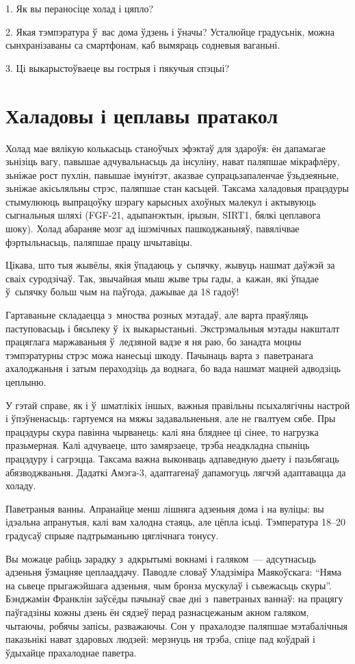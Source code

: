 1. Як вы пераносіце холад і цяпло?

2. Якая тэмпэратура ў~вас дома ўдзень і ўначы? Усталюйце градусьнік, можна сынхранізаваны са смартфонам, каб вымяраць содневыя ваганьні.

3. Ці выкарыстоўваеце вы гострыя і пякучыя спэцыі?


\section{Халадовы і цеплавы пратакол}

Холад мае вялікую колькасьць станоўчых эфэктаў для здароўя: ён дапамагае зьнізіць вагу, павышае адчувальнасьць да інсуліну, нават паляпшае мікрафлёру, зьніжае рост пухлін, павышае імунітэт, аказвае супрацьзапаленчае ўзьдзеяньне, зьніжае акісьляльны стрэс, паляпшае стан касьцей. Таксама халадовыя працэдуры стымулююць выпрацоўку шэрагу карысных ахоўных малекул і актывуюць сыгнальныя шляхі (FGF-21, адыпанэктын, ірызын, SIRT1, бялкі цеплавога шоку). Холад абараняе мозг ад ішэмічных пашкоджаньняў, павялічвае фэртыльнасьць, паляпшае працу шчытавіцы.

Цікава, што тыя жывёлы, якія ўпадаюць у~сьпячку, жывуць нашмат даўжэй за сваіх суродзічаў. Так, звычайная мыш жыве тры гады, а~кажан, які ўпадае ў~сьпячку больш чым на паўгода, дажывае да 18 гадоў!

Гартаваньне складаецца з~мноства розных мэтадаў, але варта праяўляць паступовасьць і бясьпеку ў~іх выкарыстаньні. Экстрэмальныя мэтады накшталт працяглага маржаваньня ў~ледзяной вадзе я ня раю, бо занадта моцны тэмпэратурны стрэс можа нанесьці шкоду. Пачынаць варта з~паветранага ахалоджаньня і затым пераходзіць да воднага, бо вада нашмат мацней адводзіць цеплыню.

У гэтай справе, як і ў~шматлікіх іншых, важныя правільны псыхалягічны настрой і ўпэўненасьць: гартуемся на мяжы задавальненьня, але не гвалтуем сябе. Пры працэдуры скура павінна чырванець: калі яна бляднее ці сінее, то нагрузка празьмерная. Калі адчуваеце, што замярзаеце, трэба неадкладна спыніць працэдуру і сагрэцца. Таксама важна выконваць адпаведную дыету і пазьбягаць абязводжваньня. Дадаткі Амэга-3, адаптагенаў дапамогуць лягчэй адаптавацца да холаду.

Паветраныя ванны. Апранайце менш лішняга адзеньня дома і на вуліцы: вы ідэальна апранутыя, калі вам халодна стаяць, але цёпла ісьці. Тэмпература 18--20 градусаў спрыяе падтрыманьню цяглічнага тонусу.

Вы можаце рабіць зарадку з~адкрытымі вокнамі і галяком~--- адсутнасьць адзеньня ўзмацняе цеплааддачу. Паводле словаў Уладзіміра Маякоўскага: ``Няма на сьвеце прыгажэйшага адзеньня, чым бронза мускулаў і сьвежасьць скуры''. Бэнджамін Франклін заўсёды пачынаў свае дні з~паветраных ваннаў: на працягу паўгадзіны кожны дзень ён сядзеў перад разнасцежаным акном галяком, чытаючы, робячы запісы, разважаючы. Сон у~прахалодзе паляпшае мэтабалічныя паказьнікі нават здаровых людзей: мерзнуць ня трэба, спіце пад коўдрай і ўдыхайце прахалоднае паветра.

